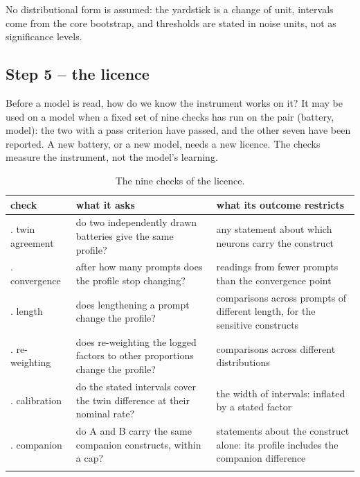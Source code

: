 \documentclass{article}
\begin{document}
No distributional form is assumed: the yardstick is a change of unit, intervals come from the core bootstrap, and thresholds are stated in noise units, not as significance levels.

\subsection{Step 5 -- the licence}

Before a model is read, how do we know the instrument works on it? It may be used on a model when a fixed set of nine checks has run on the pair (battery, model): the two with a pass criterion have passed, and the other seven have been reported. A new battery, or a new model, needs a new licence. The checks measure the instrument, not the model's learning.

\begin{table}[t]
\centering
\scriptsize
\renewcommand{\arraystretch}{1.25}
\setcounter{table}{1}
\caption{The nine checks of the licence.}
\label{tab:2}
\vspace{3pt}
\begin{tabular}{@{}>{\raggedright\arraybackslash}p{0.1833\dimexpr\textwidth-4\tabcolsep\relax}>{\raggedright\arraybackslash}p{0.4167\dimexpr\textwidth-4\tabcolsep\relax}>{\raggedright\arraybackslash}p{0.4000\dimexpr\textwidth-4\tabcolsep\relax}@{}}
\toprule
check & what it asks & what its outcome restricts \\
\midrule
1. twin agreement & do two independently drawn batteries give the same profile? & any statement about which neurons carry the construct \\\addlinespace[2.5pt]
2. convergence & after how many prompts does the profile stop changing? & readings from fewer prompts than the convergence point \\\addlinespace[2.5pt]
3. length & does lengthening a prompt change the profile? & comparisons across prompts of different length, for the sensitive constructs \\\addlinespace[2.5pt]
4. re-weighting & does re-weighting the logged factors to other proportions change the profile? & comparisons across different distributions \\\addlinespace[2.5pt]
5. calibration & do the stated intervals cover the twin difference at their nominal rate? & the width of intervals: inflated by a stated factor \\\addlinespace[2.5pt]
6. companion & do A and B carry the same companion constructs, within a cap? & statements about the construct alone: its profile includes the companion difference \\\addlinespace[2.5pt]

\end{tabular}
\end{table}
\end{document}
